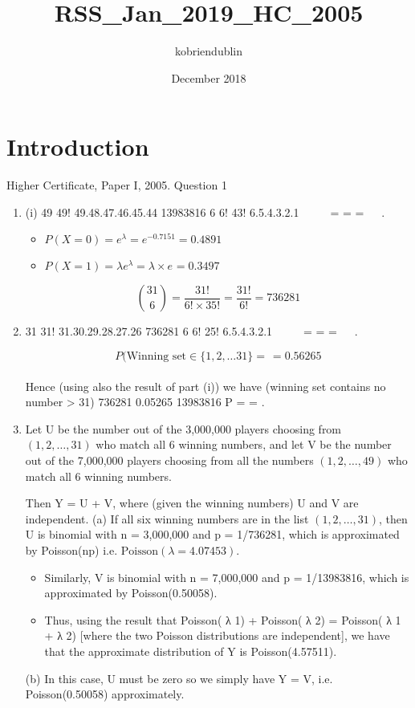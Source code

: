 \documentclass{article}
\title{RSS_Jan_2019_HC_2005}
\author{kobriendublin }
\date{December 2018}
\begin{document}
\maketitle

\section{Introduction}

Higher Certificate, Paper I, 2005. Question 1
\begin{enumerate}
\item (i)
49 49! 49.48.47.46.45.44 13983816
6 6! 43! 6.5.4.3.2.1
 
  = = =
 
.


\begin{itemize}
\item $P(X=0) = e^{\lambda} = e^{-0.7151} = 0.4891 $ 
\item $P(X=1) = \lambda e^{\lambda} = \lambda \times  e^{} = 0.3497 $ 
\end{itemize}

\[ { 31 \choose 6} = \frac{31!}{6! \times 35!}  = \frac{31!}{6!} = 736281\]


\item 
31 31! 31.30.29.28.27.26 736281
6 6! 25! 6.5.4.3.2.1
 
  = = =
 
.



\[ P(\mbox{Winning set} \in \{1,2,\ldots 31\} = \frac{}{} = 0.56265\]




Hence (using also the result of part (i)) we have
(winning set contains no number > 31) 736281 0.05265
13983816
P = = .
\item  Let U be the number out of the 3,000,000 players choosing from $(1, 2, \ldots, 31)$
who match all 6 winning numbers, and let V be the number out of the 7,000,000
players choosing from all the numbers $(1, 2,\ldots, 49)$ who match all 6 winning
numbers.

Then Y = U + V, where (given the winning numbers) U and V are independent.
(a) If all six winning numbers are in the list $(1, 2, \ldots, 31)$, then U is
binomial with n = 3,000,000 and p = 1/736281, which is approximated by
Poisson(np) i.e. $\mbox{Poisson} (\lambda = 4.07453)$.
\begin{itemize}
\item Similarly, V is binomial with n = 7,000,000 and p = 1/13983816, which is
approximated by Poisson(0.50058).
\item Thus, using the result that Poisson( λ
1) + Poisson( λ
2) = Poisson( λ
1 + λ
2)
[where the two Poisson distributions are independent], we have that the
approximate distribution of Y is Poisson(4.57511).
\end{itemize}
(b) In this case, U must be zero so we simply have Y = V, i.e.
Poisson(0.50058) approximately.
\end{enumerate}
\end{document}
